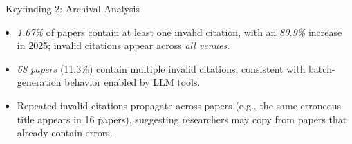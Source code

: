 

\begin{keyfindingsSidebar}{\faLightbulb\ Keyfinding 2: Archival Analysis}
\begin{itemize}
    \setlength{\itemsep}{0pt}
    \setlength{\topsep}{0pt}
    \setlength{\partopsep}{0pt}
    \setlength{\parsep}{0pt}
    \item \textit{1.07\%} of papers contain at least one invalid citation, with an \textit{80.9\%} increase in 2025; invalid citations appear across \textit{all venues}.
    \item \textit{68 papers} (11.3\%) contain multiple invalid citations, consistent with batch-generation behavior enabled by LLM tools.
    \item Repeated invalid citations propagate across papers (e.g., the same erroneous title appears in 16 papers), suggesting researchers may copy from papers that already contain errors.
\end{itemize}
\end{keyfindingsSidebar}


